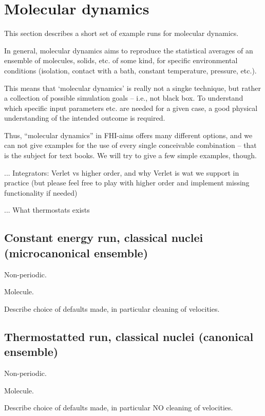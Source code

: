 \section{Molecular dynamics}
\label{Sec:examples-MD}

This section describes a short set of example runs for molecular dynamics.

In general, molecular dynamics aims to reproduce the statistical
averages of an ensemble of molecules, solids, etc. of some kind, for
specific environmental conditions (isolation, contact with a bath,
constant temperature, pressure, etc.).

This means that `molecular dynamics' is really not a singke technique,
but rather a collection of possible simulation goals -- i.e., not
black box. To understand which specific input parameters etc. are
needed for a given case, a good physical understanding of the intended
outcome is required.

Thus, ``molecular dynamics'' in FHI-aims offers many different
options, and we can not give examples for the use of every single
conceivable combination -- that is the subject for text books. We will
try to give a few simple examples, though.

... Integrators: Verlet vs higher order, and why Verlet is wat we
support in practice (but please feel free to play with higher order
and implement missing functionality if needed)

... What thermostats exists

\subsection*{Constant energy run, classical nuclei (microcanonical ensemble)}

Non-periodic.

Molecule.

Describe choice of defaults made, in particular cleaning of velocities.

\subsection*{Thermostatted run, classical nuclei (canonical ensemble)}

Non-periodic.

Molecule.

Describe choice of defaults made, in particular NO cleaning of velocities.

